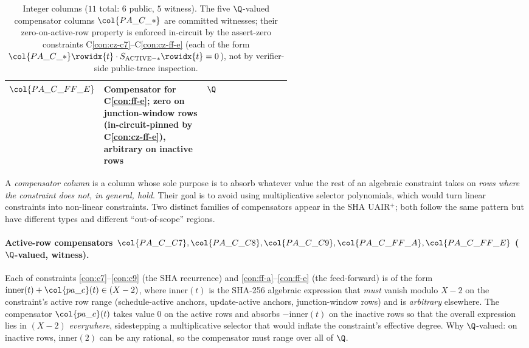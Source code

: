 \begin{table}[h]
\begin{tabularx}{\linewidth}{>{\raggedright\arraybackslash}p{0.24\linewidth} >{\raggedright\arraybackslash}X >{\raggedright\arraybackslash}p{0.30\linewidth}}
$\col{PA\_C\_FF\_E}$        & Compensator for C\ref{con:ff-e}; zero on junction-window rows (in-circuit-pinned by C\ref{con:cz-ff-e}), arbitrary on inactive rows & $\Q$ \\
\bottomrule
\end{tabularx}
\caption{Integer columns ($11$ total: $6$ public, $5$ witness). The five $\Q$-valued compensator columns $\col{PA\_C\_*}$ are committed witnesses; their zero-on-active-row property is enforced in-circuit by the assert-zero constraints C\ref{con:cz-c7}--C\ref{con:cz-ff-e} (each of the form $\col{PA\_C\_*}\rowidx{t} \cdot S_{\mathrm{ACTIVE-*}}\rowidx{t} = 0$), not by verifier-side public-trace inspection.}
\label{tab:int-cols}
\end{table}


\begin{remark}\label{rem:what-is-comp}
A \emph{compensator column} is a column whose sole purpose
is to absorb whatever value the rest of an algebraic constraint
takes on \emph{rows where the constraint does not, in general, hold}. Their goal is to avoid using multiplicative selector polynomials, which would turn linear constraints into non-linear constraints. 
Two distinct families of compensators appear in the SHA UAIR$^+$;
both follow the same pattern but have different types and different
``out-of-scope'' regions.

\paragraph{Active-row compensators
$\col{PA\_C\_C7}, \col{PA\_C\_C8}, \col{PA\_C\_C9}, \col{PA\_C\_FF\_A}, \col{PA\_C\_FF\_E}$
($\Q$-valued, witness).}
Each of constraints \ref{con:c7}--\ref{con:c9} (the SHA recurrence)
and \ref{con:ff-a}--\ref{con:ff-e} (the feed-forward) is of the form
$\mathrm{inner}(t) + \col{pa\_c}(t) \in (X-2)$, where
$\mathrm{inner}(t)$ is the SHA-256 algebraic expression that
\emph{must} vanish modulo $X-2$ on the constraint's active row range
(schedule-active anchors, update-active anchors, junction-window rows)
and is \emph{arbitrary} elsewhere. The compensator $\col{pa\_c}(t)$
takes value $0$ on the active rows and absorbs $-\mathrm{inner}(t)$
on the inactive rows so that the overall expression lies in $(X-2)$
\emph{everywhere}, sidestepping a multiplicative selector that would
inflate the constraint's effective degree. Why $\Q$-valued: on
inactive rows, $\mathrm{inner}(2)$ can be any rational, so the
compensator must range over all of $\Q$.


\end{remark}
